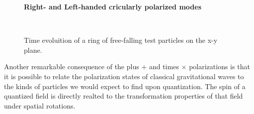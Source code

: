 \begin{figure}
\centering
    \textbf{ Right- and Left-handed cricularly polarized modes}\par\medskip
\centering

 \quad
{} \\
\caption{Time evoluition of a ring of free-falling test particles on the x-y plane.}
\label{plus_and_times}

\end{figure}
Another remarkable consequence of the plus $+$ and times $\times$ polarizations is that it is possible to relate the polarization states of classical gravitational waves to the kinds of particles we would expect to find upon quantization.
The spin of a quantized field is directly realted to the transformation properties of that field under spatial rotations.
